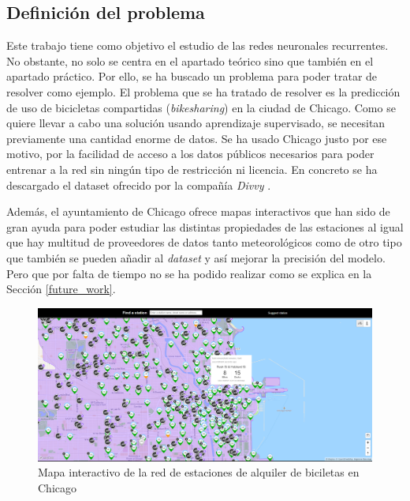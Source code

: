 \subsection{Definición del problema}

Este trabajo tiene como objetivo el estudio de las redes neuronales recurrentes. No obstante, no solo se centra en el apartado teórico sino que también en el apartado práctico. Por ello, se ha buscado un problema para poder tratar de resolver como ejemplo. El problema que se ha tratado de resolver es la predicción de uso de bicicletas compartidas (\textit{bikesharing}) en la ciudad de Chicago. Como se quiere llevar a cabo una solución usando aprendizaje supervisado, se necesitan previamente una cantidad enorme de datos. Se ha usado Chicago justo por ese motivo, por la facilidad de acceso a los datos públicos necesarios para poder entrenar a la red sin ningún tipo de restricción ni licencia. En concreto se ha descargado el dataset ofrecido por la compañía \textit{Divvy} \cite{divvy}.
\newline
 
Además, el ayuntamiento de Chicago ofrece mapas interactivos \cite{chicagomap} que han sido de gran ayuda para poder estudiar las distintas propiedades de las estaciones al igual que hay multitud de proveedores de datos tanto meteorológicos \cite{chicagoweather} como de otro tipo que también se pueden añadir al \textit{dataset} y así mejorar la precisión del modelo. Pero que por falta de tiempo no se ha podido realizar como se explica en la Sección \ref{future_work}.

\begin{figure}[H]
    \centering
    \includegraphics[width=14cm]{images/solution/preprocessing/divvy-map.png}
    \caption{Mapa interactivo de la red de estaciones de alquiler de biciletas en Chicago \cite{chicagomap}}
\end{figure}
